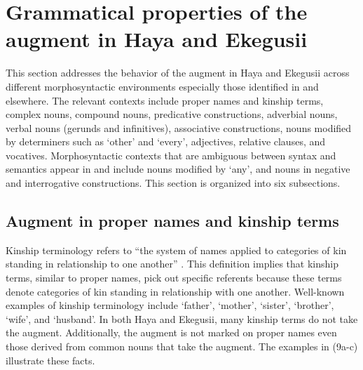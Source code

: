 \documentclass[output=paper]{langscibook}
\begin{document}
\section{Grammatical properties of the augment in Haya and Ekegusii}\label{sec:choti:4}
This section addresses the behavior of the augment in Haya and Ekegusii across different morphosyntactic environments especially those identified in \citet{blois1970augment} and elsewhere. The relevant contexts include proper names and kinship terms, complex nouns, compound nouns, predicative constructions, adverbial nouns, verbal nouns (gerunds and infinitives), associative constructions, nouns modified by determiners such as ‘other’ and ‘every’, adjectives, relative clauses, and vocatives. Morphosyntactic contexts that are ambiguous between syntax and semantics appear in  and include nouns modified by ‘any’, and nouns in negative and interrogative constructions. This section is organized into six subsections.

\subsection{Augment in proper names and kinship terms}\label{sec:choti:4.1}
Kinship terminology refers to “the system of names applied to categories of kin standing in relationship to one another” \citep{britannica2017}. This definition implies that kinship terms, similar to proper names, pick out specific referents because these terms denote categories of kin standing in relationship with one another. Well-known examples of kinship terminology include ‘father’, ‘mother’, ‘sister’, ‘brother’, ‘wife’, and ‘husband’. In both Haya and Ekegusii, many kinship terms do not take the augment. Additionally, the augment is not marked on proper names even those derived from common nouns that take the augment. The examples in (9a-c) illustrate these facts.
\end{document}

